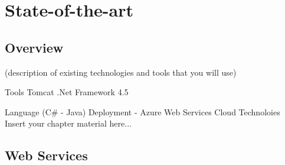 
\chapter{State-of-the-art}
\label{chapter:stateofart}


\section{Overview}
\label{section:overview}

(description of existing technologies and tools that you will use)


Tools
Tomcat
.Net Framework 4.5

Language (C# - Java)
Deployment -
Azure Web Services Cloud Technoloies
Insert your chapter material here...


\section{Web Services}
\label{section:webservices}

